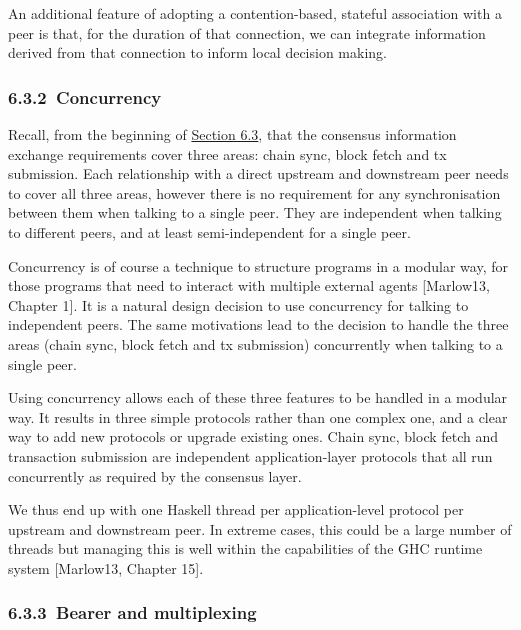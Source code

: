 \documentclass[]{article}
\begin{document}
An additional feature of adopting a contention-based, stateful
association with a peer is that, for the duration of that connection, we
can integrate information derived from that connection to inform local
decision making.

\hypertarget{concurrency}{%
\subsubsection{​6.3.2​~Concurrency}\label{concurrency}}

Recall, from the beginning of
\protect\hyperlink{network-constraints-and-design-decisions}{{Section
6.3}}, that the consensus information exchange requirements cover three
areas: chain sync, block fetch and tx submission. Each relationship with
a direct upstream and downstream peer needs to cover all three areas,
however there is no requirement for any synchronisation between them
when talking to a single peer. They are independent when talking to
different peers, and at least semi-independent for a single peer.

Concurrency is of course a technique to structure programs in a modular
way, for those programs that need to interact with multiple external
agents {[}Marlow13, Chapter 1{]}. It is a natural design decision to use
concurrency for talking to independent peers. The same motivations lead
to the decision to handle the three areas (chain sync, block fetch and
tx submission) concurrently when talking to a single peer.

Using concurrency allows each of these three features to be handled in a
modular way. It results in three simple protocols rather than one
complex one, and a clear way to add new protocols or upgrade existing
ones. Chain sync, block fetch and transaction submission are independent
application-layer protocols that all run concurrently as required by the
consensus layer.

We thus end up with one Haskell thread per application-level protocol
per upstream and downstream peer. In extreme cases, this could be a
large number of threads but managing this is well within the
capabilities of the GHC runtime system {[}Marlow13, Chapter 15{]}.

\hypertarget{bearer-and-multiplexing}{%
\subsubsection{​6.3.3​~Bearer and
multiplexing}\label{bearer-and-multiplexing}}
\end{document}
